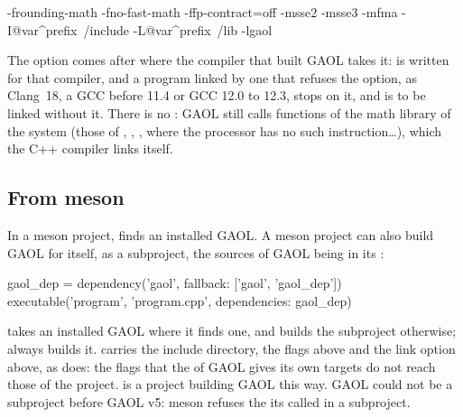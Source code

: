 \documentclass[12pt,a4paper,twoside,openright]{book}
\begin{document}
\begin{cmdshell}
-frounding-math -fno-fast-math -ffp-contract=off
-msse2 -msse3 -mfma -I@var^prefix~/include -L@var^prefix~/lib -lgaol
\end{cmdshell}

\noindent
The option  comes after  where the
compiler that built GAOL takes it:  is written for that
compiler, and a program linked by one that refuses the option, as Clang~18, a
GCC before 11.4 or GCC 12.0 to 12.3, stops on it, and is to be linked without
it. There is no : GAOL still calls functions of the math library of
the system (those of , , ,
 where the processor has no such instruction\ldots), which the
C++ compiler links itself.\newinvfive

\subsection{From meson}\label{sec:compiling-meson}
%

In a meson project,  finds an installed GAOL. A
meson project can also build GAOL for itself, as a subproject, the sources of
GAOL being in its :\newinvfive

\begin{example}
gaol_dep = dependency('gaol', fallback: ['gaol', 'gaol_dep'])
executable('program', 'program.cpp', dependencies: gaol_dep)
\end{example}

\noindent
{} takes an installed GAOL where it finds one, and builds the
subproject otherwise; 
always builds it.  carries the include directory, the flags
above and the link option above, as  does: the flags that the
 of GAOL gives its own targets do not reach those of the
project.  is a project building GAOL this way.
GAOL could not be a subproject before GAOL v5: meson refuses the
 its  called in a subproject.
\end{document}
